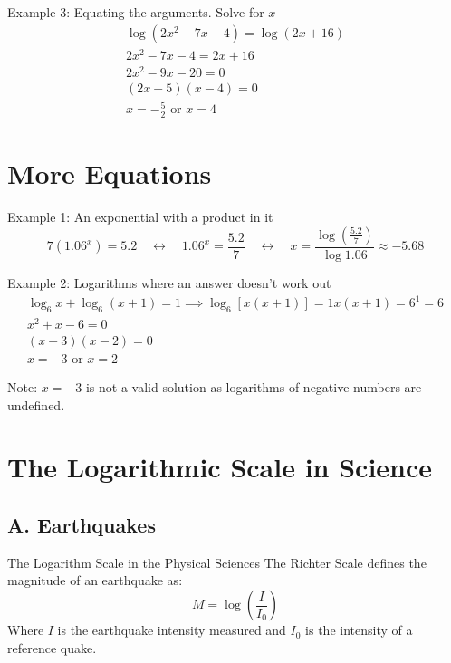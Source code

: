 \documentclass{article}
\begin{document}
\begin{examplebox}{Example 3: Equating the arguments. Solve for \( x \)}
\begin{align*}
\log{(2x^2 - 7x - 4)} = \log{(2x + 16)} \\
2x^2 - 7x - 4 = 2x + 16 \\
2x^2 - 9x - 20 = 0 \\
(2x + 5)(x - 4) = 0 \\
x = -\frac{5}{2} \text{ or } x = 4
\end{align*}

\end{examplebox}

\section{More Equations}

\begin{examplebox}{Example 1: An exponential with a product in it}
\[
7(1.06^x) = 5.2 \quad \leftrightarrow \quad 1.06^x = \frac{5.2}{7} \quad \leftrightarrow \quad x = \frac{\log{\left(\frac{5.2}{7}\right)}}{\log{1.06}} \approx -5.68
\]
\end{examplebox}

\begin{examplebox}{Example 2: Logarithms where an answer doesn't work out}
\begin{align*}
\log_6{x} + \log_6{(x+1)} = 1 \implies \log_6{[x(x+1)]} = 1 
x(x+1) = 6^1 = 6 \\
x^2 + x - 6 = 0 \\
(x+3)(x-2) = 0 \\
x = -3 \text{ or } x = 2
\end{align*}


Note: \( x = -3 \) is not a valid solution as logarithms of negative numbers are undefined.
\end{examplebox}

\section{The Logarithmic Scale in Science}

\subsection{A. Earthquakes}
\begin{lessonbox}{The Logarithm Scale in the Physical Sciences}
The Richter Scale defines the magnitude of an earthquake as:
\[
M = \log{\left(\frac{I}{I_0}\right)}
\]
Where \( I \) is the earthquake intensity measured and \( I_0 \) is the intensity of a reference quake.
\end{lessonbox}
\end{document}

